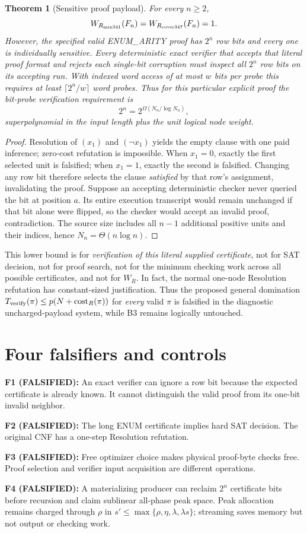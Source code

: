 \documentclass[11pt]{article}
\newtheorem{theorem}{Theorem}
\begin{document}
\begin{theorem}[Sensitive proof payload]
For every $n\ge2$,
\[
W_{R_{\rm mix341}}(F_n)=W_{R_{\rm cover347}}(F_n)=1.
\]
However, the specified valid ENUM\_ARITY proof has $2^n$ row bits and \emph{every one is individually sensitive}. Every deterministic exact verifier that accepts that literal proof format and rejects each single-bit corruption must inspect all $2^n$ row bits on its accepting run. With indexed word access of at most $w$ bits per probe this requires at least $\lceil 2^n/w\rceil$ word probes. Thus for this particular explicit proof the bit-probe verification requirement is
\[
2^n=2^{\Omega(N_n/\log N_n)},
\]
superpolynomial in the input length plus the unit logical node weight.
\end{theorem}
\begin{proof}
Resolution of $(x_1)$ and $(\neg x_1)$ yields the empty clause with one paid inference; zero-cost refutation is impossible. When $x_1=0$, exactly the first selected unit is falsified; when $x_1=1$, exactly the second is falsified. Changing any row bit therefore selects the clause \emph{satisfied} by that row's assignment, invalidating the proof. Suppose an accepting deterministic checker never queried the bit at position $a$. Its entire execution transcript would remain unchanged if that bit alone were flipped, so the checker would accept an invalid proof, contradiction. The source size includes all $n-1$ additional positive units and their indices, hence $N_n=\Theta(n\log n)$.
\end{proof}

This lower bound is for \emph{verification of this literal supplied certificate}, not for SAT decision, not for proof search, not for the minimum checking work across all possible certificates, and not for $W_R$. In fact, the normal one-node Resolution refutation has constant-sized justification. Thus the proposed general domination $T_{\rm verify}(\pi)\le p(N+\operatorname{cost}_R(\pi))$ for \emph{every} valid $\pi$ is falsified in the diagnostic uncharged-payload system, while B3 remains logically untouched.

\section{Four falsifiers and controls}
\noindent\textbf{F1 (FALSIFIED):} An exact verifier can ignore a row bit because the expected certificate is already known. It cannot distinguish the valid proof from its one-bit invalid neighbor.
\par\noindent\textbf{F2 (FALSIFIED):} The long ENUM certificate implies hard SAT decision. The original CNF has a one-step Resolution refutation.
\par\noindent\textbf{F3 (FALSIFIED):} Free optimizer choice makes physical proof-byte checks free. Proof selection and verifier input acquisition are different operations.
\par\noindent\textbf{F4 (FALSIFIED):} A materializing producer can reclaim $2^n$ certificate bits before recursion and claim sublinear all-phase peak space. Peak allocation remains charged through $\rho$ in $s'\le\max\{\rho,\eta,\lambda,\lambda s\}$; streaming saves memory but not output or checking work.
\end{document}
